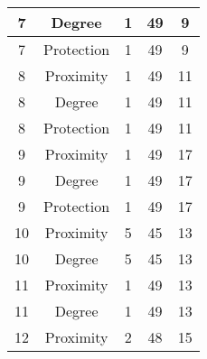 \documentclass[results.tex]{subfiles}
\begin{document}
\begin{center}
\begin{tabular}{| c || c | c | c | c |}
            \hline
            7                       & Degree                       & 1                      & 49                      & 9                    \\
            \hline
            7                       & Protection                   & 1                      & 49                      & 9                    \\
            \hline
            8                       & Proximity                    & 1                      & 49                      & 11                   \\
            \hline
            8                       & Degree                       & 1                      & 49                      & 11                   \\
            \hline
            8                       & Protection                   & 1                      & 49                      & 11                   \\
            \hline
            9                       & Proximity                    & 1                      & 49                      & 17                   \\
            \hline
            9                       & Degree                       & 1                      & 49                      & 17                   \\
            \hline
            9                       & Protection                   & 1                      & 49                      & 17                   \\
            \hline
            10                      & Proximity                    & 5                      & 45                      & 13                   \\
            \hline
            10                      & Degree                       & 5                      & 45                      & 13                   \\
            \hline
            11                      & Proximity                    & 1                      & 49                      & 13                   \\
            \hline
            11                      & Degree                       & 1                      & 49                      & 13                   \\
            \hline
            12                      & Proximity                    & 2                      & 48                      & 15                   \\

\end{tabular}
\end{center}
\end{document}
